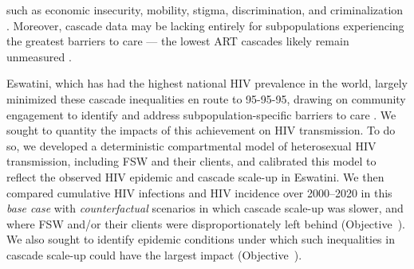 such as economic insecurity, mobility, stigma, discrimination, and criminalization
\cite{Lancaster2016sr,Wanyenze2016,Schwartz2017,Schmidt-Sane2022}.
Moreover, cascade data may be lacking entirely
for subpopulations experiencing the greatest barriers to care
--- \ie the lowest ART cascades likely remain unmeasured \cite{Hakim2018}.
\par
Eswatini, which has had the highest national HIV prevalence in the world,
largely minimized these cascade inequalities en route to 95-95-95,
drawing on community engagement to identify and address
subpopulation-specific barriers to care \cite{Walsh2020,SHIMS3,EswIBBS2022}.
We sought to quantity the impacts of this achievement on HIV transmission.
To do so, we developed a deterministic compartmental model
of heterosexual HIV transmission, including FSW and their clients,
and calibrated this model to reflect
the observed HIV epidemic and cascade scale-up in Eswatini.
We then compared cumulative HIV infections and HIV incidence over 2000--2020
in this \emph{base case} with \emph{counterfactual} scenarios in which
cascade scale-up was slower, and where
FSW and/or their clients were disproportionately left behind
(Objective~).
We also sought to identify epidemic conditions under which
such inequalities in cascade scale-up could have the largest impact
(Objective~).
